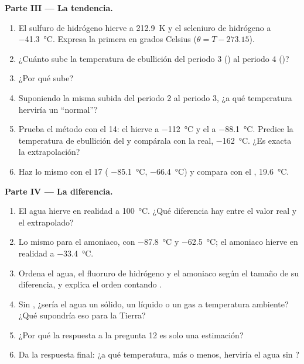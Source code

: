 \begin{problem}
\medskip
\noindent\textbf{Parte III --- La tendencia.}
\begin{enumerate}[resume]
  \item El sulfuro de hidrógeno hierve a \qty{212.9}{K} y el seleniuro
        de hidrógeno a \qty{-41.3}{\celsius}. Expresa la primera en grados
        Celsius
        ($\theta = T - 273.15$).
  \item ¿Cuánto sube la temperatura de ebullición del periodo 3
        () al periodo 4 ()?
  \item ¿Por qué sube?
  \item Suponiendo la misma subida del periodo 2 al periodo 3, ¿a qué
        temperatura herviría un  ``normal''?
  \item Prueba el método con el  14: el  hierve a
        \qty{-112}{\celsius} y el  a \qty{-88.1}{\celsius}.
        Predice la temperatura de ebullición del  y compárala con
        la real, \qty{-162}{\celsius}. ¿Es exacta la extrapolación?
  \item Haz lo mismo con el  17 ( \qty{-85.1}{\celsius},
         \qty{-66.4}{\celsius}) y compara con el ,
        \qty{19.6}{\celsius}.
\end{enumerate}

\medskip
\noindent\textbf{Parte IV --- La diferencia.}
\begin{enumerate}[resume]
  \item El agua hierve en realidad a \qty{100}{\celsius}. ¿Qué
        diferencia hay entre el valor real y el extrapolado?
  \item Lo mismo para el amoniaco, con  \qty{-87.8}{\celsius} y
         \qty{-62.5}{\celsius}; el amoniaco hierve en realidad
        a
        \qty{-33.4}{\celsius}.
  \item Ordena el agua, el fluoruro de hidrógeno y el amoniaco según el
        tamaño de su diferencia, y explica el orden contando .
  \item Sin , ¿sería el agua un sólido, un líquido o
        un gas a temperatura ambiente? ¿Qué supondría eso para la
        Tierra?
  \item ¿Por qué la respuesta a la pregunta 12 es solo una estimación?
  \item Da la respuesta final: ¿a qué temperatura, más o menos, herviría
        el agua sin ?
\end{enumerate}
\end{problem}
